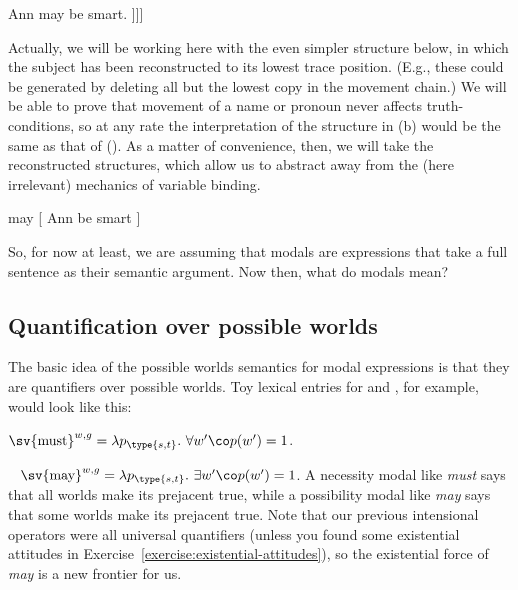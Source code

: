 \pex
\a Ann may be smart. 
\a\null [ Ann [ $\lambda_1$ [ may [ t$_1$ be smart ]]]]
\xe

Actually, we will be working here with the even simpler structure below, in
which the subject has been reconstructed to its lowest trace position. (E.g.,
these could be generated by deleting all but the lowest copy in the movement
chain.) We will be
able to prove that movement of a name or pronoun never affects truth-conditions,
so at any rate the interpretation of the structure in (\lastx b) would be the
same as that of (\nextx). As a matter of convenience, %
%
then, we will take the reconstructed structures, which allow us to abstract away
from the (here irrelevant) mechanics of variable binding.

\ex may [ Ann be smart ] \xe

So, for now at least, we are assuming that modals are expressions that take a
full sentence as their semantic argument. Now then, what do modals mean?

\subsection{Quantification over possible worlds} \label{sec:quant-over-poss}

%
The basic idea of the possible worlds semantics for modal expressions is that
they are quantifiers over possible worlds. Toy lexical entries for
 and , for example, would look like this:

\ex $\sv{\mbox{must}}^{w,g} = \lambda p_{\type{s,t}}.\ \forall w'\co p(w') =
1$. \xe

\ex~ $\sv{\mbox{may}}^{w,g} = \lambda p_{\type{s,t}}.\ \exists w'\co p(w') =
1$. \xe
%
%
A necessity modal like \emph{must} says that all worlds make its prejacent true,
while a possibility modal like \emph{may} says that some worlds make its
prejacent true. Note that our previous intensional operators were all universal
quantifiers (unless you found some existential attitudes in
Exercise~\ref{exercise:existential-attitudes}), so the existential force of
\emph{may} is a new frontier for us.


